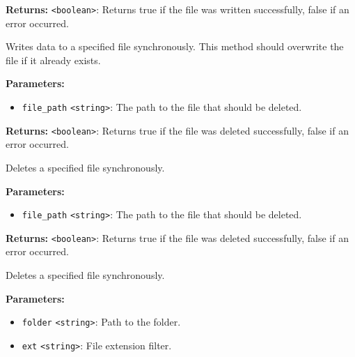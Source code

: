\documentclass[12pt,a4paper]{article}
\begin{document}
\noindent \textbf{Returns:} \texttt{<boolean>}: Returns true if the file was written successfully, false if an error occurred.

\noindent Writes data to a specified file synchronously. This method should overwrite the file if it already exists.

\vspace{5mm}
\noindent {}


\noindent \textbf{Parameters:}
\begin{itemize}
  \item \texttt{file\_path} \texttt{<string>}: The path to the file that should be deleted.
\end{itemize}

\noindent \textbf{Returns:} \texttt{<boolean>}: Returns true if the file was deleted successfully, false if an error occurred.

\noindent Deletes a specified file synchronously.

\vspace{5mm}
\noindent {}


\noindent \textbf{Parameters:}
\begin{itemize}
  \item \texttt{file\_path} \texttt{<string>}: The path to the file that should be deleted.
\end{itemize}

\noindent \textbf{Returns:} \texttt{<boolean>}: Returns true if the file was deleted successfully, false if an error occurred.

\noindent Deletes a specified file synchronously.

\vspace{5mm}
\noindent {}


\noindent \textbf{Parameters:}
\begin{itemize}
  \item \texttt{folder} \texttt{<string>}: Path to the folder.
  \item \texttt{ext} \texttt{<string>}: File extension filter.
\end{itemize}
\end{document}
